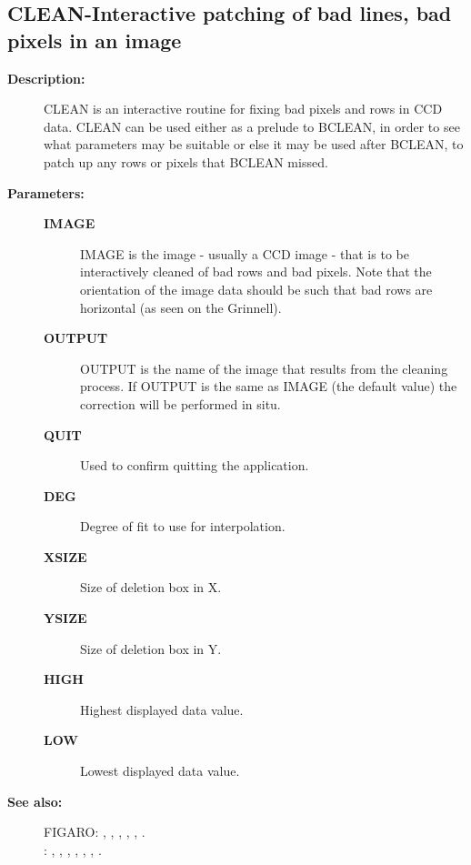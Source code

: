 \subsection{CLEAN-\label{CLEAN}Interactive patching of bad lines, bad pixels in an image}
\begin{description}

\item [{\bf Description:}]
 CLEAN is an interactive routine for fixing bad pixels and
 rows in CCD data.  CLEAN can be used either as a prelude
 to BCLEAN, in order to see what parameters may be suitable
 or else it may be used after BCLEAN, to patch up any rows
 or pixels that BCLEAN missed.

\item [{\bf Parameters:}]
\begin{description}
\item [{\bf IMAGE}]
 IMAGE is the image - usually a CCD image - that is to be
 interactively cleaned of bad rows and bad pixels.  Note that the
 orientation of the image data should be such that bad rows are
 horizontal (as seen on the Grinnell).
\item [{\bf OUTPUT}]
 OUTPUT is the name of the image that results from the cleaning
 process.  If OUTPUT is the same as IMAGE (the default value) the
 correction will be performed in situ.
\item [{\bf QUIT}]
 Used to confirm quitting the application.
\item [{\bf DEG}]
 Degree of fit to use for interpolation.
\item [{\bf XSIZE}]
 Size of deletion box in X.
\item [{\bf YSIZE}]
 Size of deletion box in Y.
\item [{\bf HIGH}]
 Highest displayed data value.
\item [{\bf LOW}]
 Lowest displayed data value.
\end{description}

\item [{\bf See also:}]
FIGARO: , , , , , .\\
: , , , , , , .\\


\end{description}
